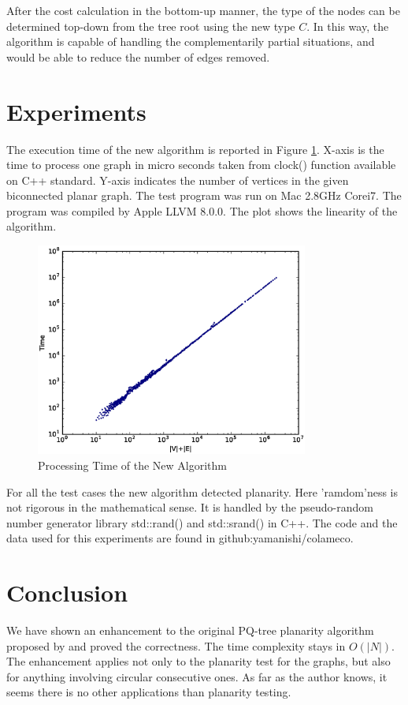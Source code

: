 \documentclass[a4]{jgaa-art}
\begin{document}
After the cost calculation in the bottom-up manner, the type of the nodes can be determined
top-down from the tree root using the new type $C$.
In this way, the algorithm is capable of handling the complementarily partial situations, and 
would be able to reduce the number of edges removed.



\section{Experiments}\label{se:experiments}
The execution time of the new algorithm is reported in Figure \ref{fig:plot_02}.
X-axis is the time to process one graph in micro seconds taken from clock() function available on C++ standard.
Y-axis indicates the number of vertices in the given biconnected planar graph.
The test program was run on Mac 2.8GHz Corei7. 
The program was compiled by Apple LLVM 8.0.0.
The plot shows the linearity of the algorithm.

\begin{figure}[!htb]
  \centering
  \includegraphics[width=0.8\textwidth]{plot_performance_01}
  \caption{Processing Time of the New Algorithm}
  \label{fig:plot_02}
\end{figure}


For all the test cases the new algorithm detected planarity.
Here 'ramdom'ness is not rigorous in the mathematical sense.
It is handled by the pseudo-random number generator library std::rand() and std::srand() in C++.
The code and the data used for this experiments are found in github:yamanishi/colameco.




\section{Conclusion}\label{se:conclusion}
We have shown an enhancement to the original PQ-tree planarity algorithm proposed by \cite{BL76} 
and proved the correctness. The time complexity stays in $O(|N|)$.
The enhancement applies not only to the planarity test for the graphs, but also for anything 
involving circular consecutive ones. As far as the author knows, it seems
there is no other applications than planarity testing.
\end{document}
